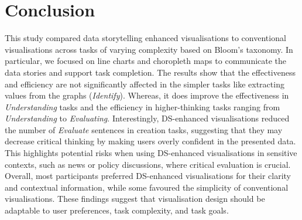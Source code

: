 \section{Conclusion}
This study compared data storytelling enhanced visualisations to conventional visualisations across tasks of varying complexity based on Bloom’s taxonomy. In particular, we focused on line charts and choropleth maps to communicate the data stories and support task completion. The results show that the effectiveness and efficiency are not significantly affected in the simpler tasks like extracting values from the graphs (\textit{Identify}). Whereas, it does improve the effectiveness in \textit{Understanding} tasks and the efficiency in higher-thinking tasks ranging from \textit{Understanding} to \textit{Evaluating}. Interestingly, DS-enhanced visualisations reduced the number of \textit{Evaluate} sentences in creation tasks, suggesting that they may decrease critical thinking by making users overly confident in the presented data. This highlights potential risks when using DS-enhanced visualisations in sensitive contexts, such as news or policy discussions, where critical evaluation is crucial. 
Overall, most participants preferred DS-enhanced visualisations for their clarity and contextual information, while some favoured the simplicity of conventional visualisations. These findings suggest that visualisation design should be adaptable to user preferences, task complexity, and task goals.

